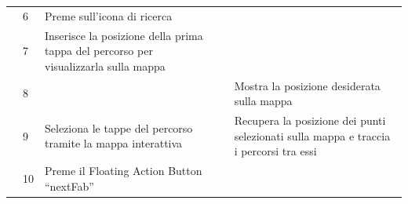 \documentclass{natourDoc}
\begin{document}
\begin{tabularx}{\linewidth}{| l | p{1cm} | p{4cm} | X | X|}
	\cline{2-5}                   & 6                                                                                                                                      & Preme sull’icona di ricerca                                                                                                                                          &                                                     &                                                                                       \\

	\cline{2-5}                   & 7                                                                                                                                      & Inserisce la posizione della prima tappa del percorso per visualizzarla sulla mappa                                                                                  &                                                     &                                                                                       \\

	\cline{2-5}                   & 8                                                                                                                                      &                                                                                                                                                                      &                                                     & Mostra la posizione desiderata sulla mappa                                            \\

	\cline{2-5}                   & 9                                                                                                                                      & Seleziona le tappe del percorso tramite la mappa interattiva                                                                                                         &                                                     & Recupera la posizione dei punti selezionati sulla mappa e traccia i percorsi tra essi \\

	\cline{2-5}                   & 10                                                                                                                                     & Preme il Floating Action Button “nextFab”                                                                                                                            &                                                     &                                                                                       \\


\end{tabularx}
\end{document}
